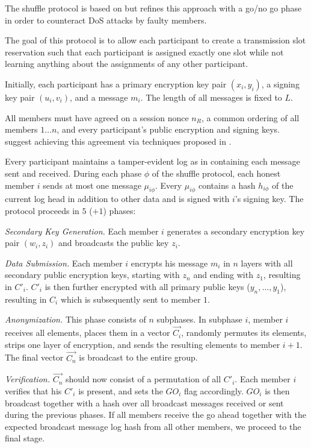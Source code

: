 The shuffle protocol is based on \cite{brickell2006efficient} but refines this approach
with a go/no go phase in order to counteract \ac{DoS} attacks by faulty members.

The goal of this protocol is to allow each participant to create a transmission slot reservation
such that each participant is assigned exactly one slot while not learning anything about
the assignments of any other participant.

Initially, each participant has a primary encryption key pair $(x_i, y_i)$, a signing key pair
$(u_i, v_i)$, and a message $m_i$. The length of all messages is fixed to $L$.

All members must have agreed on a session nonce $n_R$, a common ordering of all members
$1 \ldots n$, and every participant's public encryption and signing keys. \citeauthor{journals/corr/abs-1004-3057} suggest achieving this agreement via techniques
proposed in \cite{lamport1998part,castro1999practical}.

Every participant maintains a tamper-evident log as in \cite{haeberlen2007peerreview}
containing each message sent and received. During each phase $\phi$ of the shuffle protocol,
each honest member $i$ sends at most one message $\mu_{i\phi}$.
Every $\mu_{i\phi}$ contains a hash $h_{i\phi}$ of the current log head in addition to other data
and is signed with $i$'s signing key. The protocol proceeds in $5$ ($ + 1$) phases:

\emph{Secondary Key Generation.}
      Each member $i$ generates a secondary encryption key pair $(w_i, z_i)$ and broadcasts
      the public key $z_i$.
      
\emph{Data Submission.}
      Each member $i$ encrypts his message $m_i$ in $n$ layers with all secondary public encryption keys,
      starting with $z_n$ and ending with $z_1$, resulting in $C'_i$.  $C'_i$ is then further encrypted
      with all primary public keys ($y_n, \ldots, y_1$), resulting in $C_i$ which is subsequently
      sent to member $1$. 
      
\emph{Anonymization.}
      This phase consists of $n$ subphases. In subphase $i$, member $i$ receives all elements,
      places them in a vector $\vec{C_i}$, randomly permutes its elements, strips one layer of
      encryption, and sends the resulting elements to member $i + 1$. The final vector $\vec{C_n}$
      is broadcast to the entire group.
      
\emph{Verification.}
      $\vec{C_n}$ should now consist of a permutation of all $C'_i$. Each member $i$ verifies that
      his $C'_i$ is present, and sets the $GO_i$ flag accordingly. $GO_i$ is then broadcast
      together with a hash over all broadcast messages received or sent during the previous phases.
      If all members receive the go ahead together with the expected broadcast message log hash
      from all other members, we proceed to the final stage.
      
